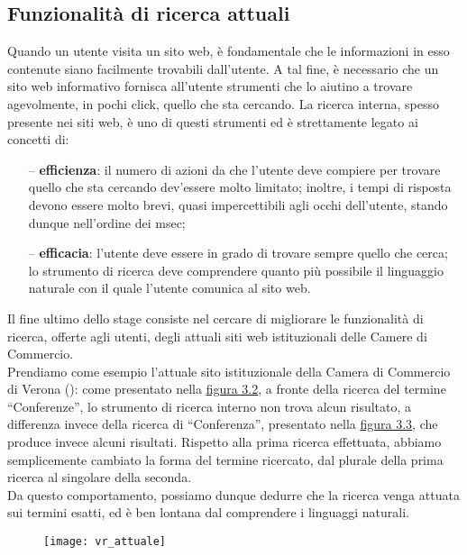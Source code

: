 		\subsection{Funzionalità di ricerca attuali}
		Quando un utente visita un sito web, è fondamentale che le informazioni in esso contenute siano facilmente trovabili dall'utente.
		A tal fine, è necessario che un sito web informativo fornisca all'utente strumenti che lo aiutino a trovare agevolmente, in pochi click, quello che sta cercando. La ricerca interna, spesso presente nei siti web, è uno di questi strumenti ed è strettamente legato ai concetti di:
		\begin{itemize}
			\item[--]{\textbf{efficienza}: il numero di azioni da che l'utente deve compiere per trovare quello che sta cercando dev'essere molto limitato; inoltre, i tempi di risposta devono essere molto brevi, quasi impercettibili agli occhi dell'utente, stando dunque nell’ordine dei msec;}
			\item[--]{\textbf{efficacia}: l’utente deve essere in grado di trovare sempre quello che cerca; lo strumento di ricerca deve comprendere quanto più possibile il linguaggio naturale con il quale l'utente comunica al sito web.}
		\end{itemize}
		
		Il fine ultimo dello stage consiste nel cercare di migliorare le funzionalità di ricerca, offerte agli utenti, degli attuali siti web istituzionali delle Camere di Commercio. \\
		Prendiamo come esempio l’attuale sito istituzionale della Camera di Commercio di Verona (\cite{site:vr_camerale}): come presentato nella \hyperref[img:conferenze]{figura 3.2}, a fronte della ricerca del termine “Conferenze”, lo strumento di ricerca interno non trova alcun risultato, a differenza invece della ricerca di “Conferenza”, presentato nella \hyperref[img:conferenza]{figura 3.3}, che produce invece alcuni risultati. Rispetto alla prima ricerca effettuata, abbiamo semplicemente cambiato la forma del termine ricercato, dal plurale della prima ricerca al singolare della seconda. \\ 
		Da questo comportamento, possiamo dunque dedurre che la ricerca venga attuata sui termini esatti, ed è ben lontana dal comprendere i linguaggi naturali.

		\begin{figure}[htbp]
			\label{img:conferenze}
			\begin{center}
				\texttt{[image: vr\_attuale]}
			\end{center}
		\end{figure}
	
